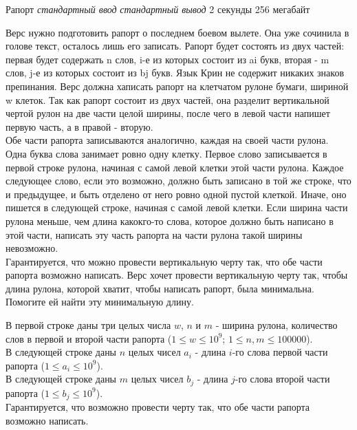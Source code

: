 \begin{problem}%
{Рапорт}%
{\textsl{стандартный ввод}}%
{\textsl{стандартный вывод}}%
{2 секунды}%
{256 мегабайт}{}

Верс нужно подготовить рапорт о последнем боевом вылете. Она уже сочинила в голове текст, осталось лишь его записать. Рапорт будет состоять из двух частей: первая будет содержать n слов, i-е из которых состоит из ai букв, вторая - m слов, j-е из которых состоит из bj букв. Язык Крин не содержит никаких знаков препинания. Верс должна хаписать рапорт на клетчатом рулоне бумаги, шириной w клеток. Так как рапорт состоит из двух частей, она разделит вертикальной чертой рулон на две части целой ширины, после чего в левой части напишет первую часть, а в правой - вторую.\\

Обе части рапорта записываются аналогично, каждая на своей части рулона. Одна буква слова занимает ровно одну клетку. Первое слово записывается в первой строке рулона, начиная с самой левой клетки этой части рулона. Каждое следующее слово, если это возможно, должно быть записано в той же строке, что и предыдущее, и быть отделено от него ровно одной пустой клеткой. Иначе, оно пишется в следующей строке, начиная с самой левой клетки. Если ширина части рулона меньше, чем длина какокго-то слова, которое должно быть написано в этой части, написать эту часть рапорта на части рулона такой ширины невозможно.\\

Гарантируется, что можно провести вертикальную черту так, что обе части рапорта возможно написать. Верс хочет провести вертикальную черту так, чтобы длина рулона, которой хватит, чтобы написать рапорт, была минимальна. Помогите ей найти эту минимальную длину.

\InputFile

В первой строке даны три целых числа $w$, $n$ и $m$ - ширина рулона, количество слов в первой и второй части рапорта ($1 \le w \le 10^9$; $1 \le n, m \le 100000$).\\

В следующей строке даны $n$ целых чисел $a_i$ - длина $i$-го слова первой части рапорта ($1 \le a_i \le 10^9$).\\

В следующей строке даны $m$ целых чисел $b_j$ - длина $j$-го слова второй части рапорта ($1 \le b_j \le 10^9$).\\

Гарантируется, что возможно провести черту так, что обе части рапорта возможно написать.


\end{problem}
